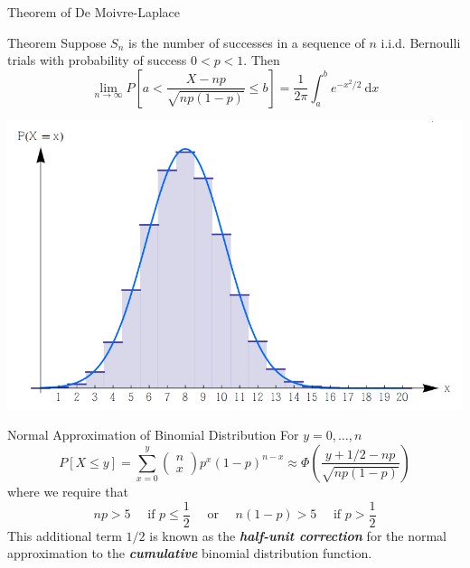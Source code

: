 \documentclass{beamer}
\newcommand{\bb}[1]{\textcolor{antiquefuchsia}{\textbf{\textit{#1}}}}
\begin{document}
\begin{frame}{Theorem of De Moivre-Laplace}
\begin{block}{Theorem}
Suppose $S_{n}$ is the number of successes in a sequence of $n$ i.i.d. Bernoulli trials with probability of success $0<p<1$. Then
$$
\lim _{n \rightarrow \infty} P\left[a<\frac{X-n p}{\sqrt{n p(1-p)}} \leq b\right]=\frac{1}{2 \pi} \int_{a}^{b} e^{-x^{2} / 2} \mathrm{~d} x
$$
\end{block}
\begin{center}
\includegraphics[scale=0.3]{appro.png}
\end{center}
\end{frame}

\begin{frame}{Normal Approximation of Binomial Distribution}
For $y=0, \ldots, n$
$$
P[X \leq y]=\sum_{x=0}^{y}\left(\begin{array}{l}
n \\
x
\end{array}\right) p^{x}(1-p)^{n-x} \approx \Phi\left(\frac{y+1 / 2-n p}{\sqrt{n p(1-p)}}\right)
$$
where we require that
$$
n p>5 \quad \text { if } p \leq \frac{1}{2} \quad \text { or } \quad n(1-p)>5 \quad \text { if } p>\frac{1}{2}
$$
This additional term $1 / 2$ is known as the \bb{half-unit correction} for the normal approximation to the \bb{cumulative} binomial distribution function.
\end{frame}
\end{document}
